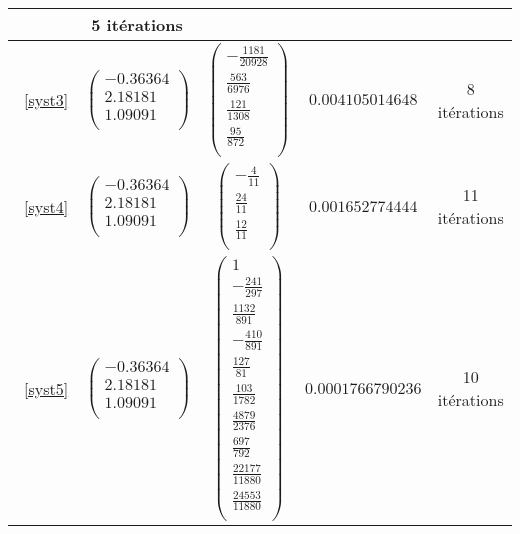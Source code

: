 \documentclass{report}
\begin{document}
\begin{tabular}{|c|c|c|c|c|}
          &
          5 itérations \\
          \hline
          ~\eqref{syst3}
          &
          $\begin{pmatrix}
              -0.36364 \\
              2.18181 \\
              1.09091 \\
          \end{pmatrix}$
          &
          $\begin{pmatrix}
              -\frac{1181}{20928} \\
              \frac{563}{6976} \\
              \frac{121}{1308} \\
              \frac{95}{872} \\
          \end{pmatrix}$
          &
          $0.004105014648$
          &
          8 itérations \\
          \hline
          ~\eqref{syst4}
          &
          $\begin{pmatrix}
              -0.36364 \\
              2.18181 \\
              1.09091 \\
          \end{pmatrix}$
          &
          $\begin{pmatrix}
              -\frac{4}{11} \\
              \frac{24}{11} \\
              \frac{12}{11} \\
          \end{pmatrix}$
          &
          $0.001652774444$
          &
          11 itérations \\
          \hline
          ~\eqref{syst5}
          &
          $\begin{pmatrix}
              -0.36364 \\
              2.18181 \\
              1.09091 \\
          \end{pmatrix}$
          &
          $\begin{pmatrix}
              1 \\
              -\frac{241}{297} \\
              \frac{1132}{891} \\
              -\frac{410}{891} \\
              \frac{127}{81} \\
              \frac{103}{1782} \\
              \frac{4879}{2376} \\
              \frac{697}{792} \\
              \frac{22177}{11880} \\
              \frac{24553}{11880} \\
          \end{pmatrix}$
          &
          $0.0001766790236$
          &
          10 itérations \\
      \hline
         \end{tabular}
\end{document}
